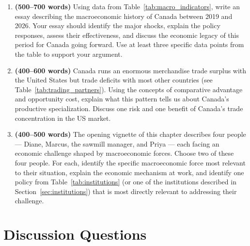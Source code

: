 \begin{enumerate}

\item \textbf{(500--700 words)} Using data from Table~\ref{tab:macro_indicators},
write an essay describing the macroeconomic history of Canada between 2019
and 2026. Your essay should identify the major shocks, explain the policy
responses, assess their effectiveness, and discuss the economic legacy of
this period for Canada going forward. Use at least three specific data
points from the table to support your argument.

\item \textbf{(400--600 words)} Canada runs an enormous merchandise trade
surplus with the United States but trade deficits with most other countries
(see Table~\ref{tab:trading_partners}). Using the concepts of comparative
advantage and opportunity cost, explain what this pattern tells us about
Canada's productive specialization. Discuss one risk and one benefit of
Canada's trade concentration in the US market.

\item \textbf{(400--500 words)} The opening vignette of this chapter
describes four people --- Diane, Marcus, the sawmill manager, and Priya
--- each facing an economic challenge shaped by macroeconomic forces.
Choose two of these four people. For each, identify the specific macroeconomic
force most relevant to their situation, explain the economic mechanism
at work, and identify one policy from Table~\ref{tab:institutions}
(or one of the institutions described in Section~\ref{sec:institutions})
that is most directly relevant to addressing their challenge.

\end{enumerate}

\section*{Discussion Questions}

